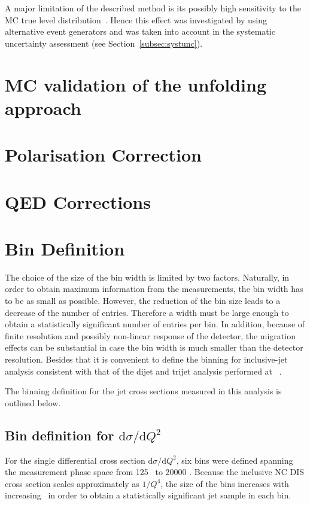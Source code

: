 A major limitation of the described method is its possibly high sensitivity to the MC true level distribution~\cite{Cowan:2002in}. Hence this effect was investigated by using alternative event generators and was taken into account in the systematic uncertainty assessment (see Section~\ref{subsec:systunc}).

\section{MC validation of the unfolding approach}
\label{sec:mcvalidation}


\section{Polarisation Correction}
\label{sec:polcor}

 
\section{QED Corrections}
\label{sec:qedcor}


\section{Bin Definition}
\label{sec:bindef}
The choice of the size of the bin width is limited by two factors. Naturally, in order to obtain maximum information from the measurements, the bin width has to be as small as possible. However, the reduction of the bin size leads to a decrease of the number of entries. Therefore a width must be large enough to obtain a statistically significant number of entries per bin. In addition, because of finite resolution and possibly non-linear response of the detector, the migration effects can be substantial in case the bin width is much smaller than the detector resolution. Besides that it is convenient to define the binning for inclusive-jet analysis consistent with that of the dijet and trijet analysis performed at \zeus~\cite{thesis:behr:2010,thesis:makarenko:2015}.

The binning definition for the jet cross sections measured in this analysis is outlined below.
\subsection*{Bin definition for ${\mathrm{d}\sigma}/{\mathrm{d}Q^2}$}
\label{subsec:bindefq2}
For the single differential cross section ${\mathrm{d}\sigma}/{\mathrm{d}Q^2}$, six bins were defined spanning the measurement phase space from 125 \GeV~to 20000 \GeV. Because the inclusive NC DIS cross section scales approximately as $1/Q^4$, the size of the bins increases with increasing \qsq~in order to obtain a statistically significant jet sample in each bin.

